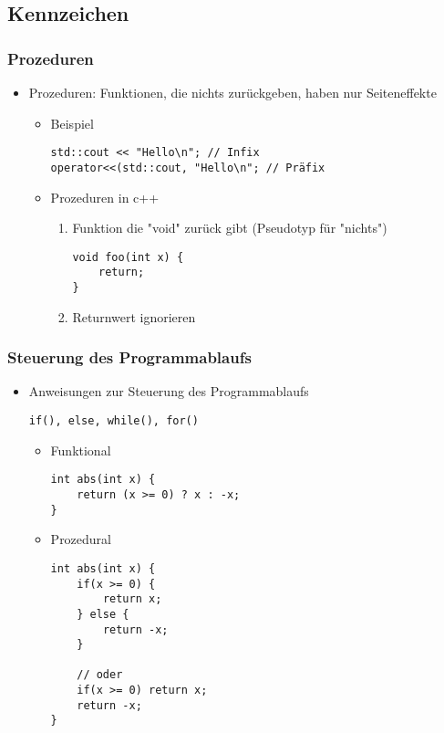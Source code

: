 \documentclass[a4paper]{scrartcl}
\theoremstyle{definition}
\theoremstyle{plain}
\theoremstyle{remark}
\theoremstyle{remark}
\begin{document}
\subsection{Kennzeichen}
\label{sec-7-2}
\subsubsection{Prozeduren}
\label{sec-7-2-1}
\begin{itemize}
\item Prozeduren: Funktionen, die nichts zurückgeben, haben nur Seiteneffekte
\begin{itemize}
\item Beispiel
\begin{verbatim}
std::cout << "Hello\n"; // Infix
operator<<(std::cout, "Hello\n"; // Präfix
\end{verbatim}
\item Prozeduren in c++
\begin{enumerate}
\item Funktion die "void" zurück gibt (Pseudotyp für "nichts")
\begin{verbatim}
void foo(int x) {
	return;
}
\end{verbatim}
\item Returnwert ignorieren
\end{enumerate}
\end{itemize}
\end{itemize}
\subsubsection{Steuerung des Programmablaufs}
\label{sec-7-2-2}
\begin{itemize}
\item Anweisungen zur Steuerung des Programmablaufs
\begin{verbatim}
if(), else, while(), for()
\end{verbatim}
\begin{itemize}
\item Funktional
\begin{verbatim}
int abs(int x) {
	return (x >= 0) ? x : -x;
}
\end{verbatim}
\item Prozedural
\begin{verbatim}
int abs(int x) {
	if(x >= 0) {
		return x;
	} else {
		return -x;
	}

	// oder
	if(x >= 0) return x;
	return -x;
}
\end{verbatim}
\end{itemize}
\end{itemize}
\end{document}
